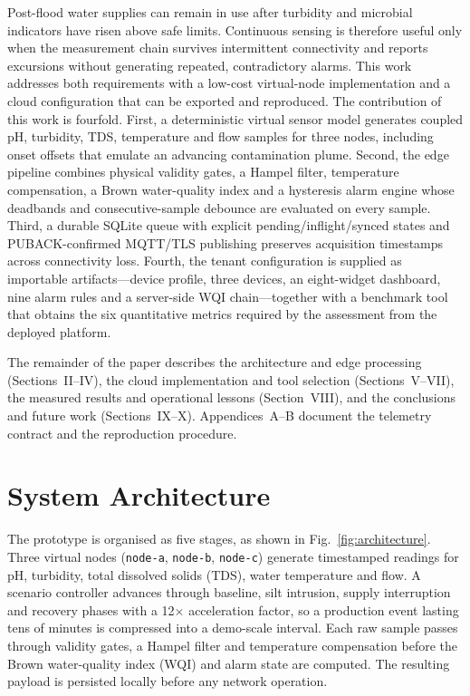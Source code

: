 \documentclass[conference]{IEEEtran}
\begin{document}
Post-flood water supplies can remain in use after turbidity and microbial indicators
have risen above safe limits. Continuous sensing is therefore useful only when the
measurement chain survives intermittent connectivity and reports excursions without
generating repeated, contradictory alarms. This work addresses both requirements with a
low-cost virtual-node implementation and a cloud configuration that can be exported and
reproduced. The contribution of this work is fourfold. First, a deterministic virtual
sensor model generates coupled pH, turbidity, TDS, temperature and flow samples for
three nodes, including onset offsets that emulate an advancing contamination plume.
Second, the edge pipeline combines physical validity gates, a Hampel filter,
temperature compensation, a Brown water-quality index and a hysteresis alarm engine
whose deadbands and consecutive-sample debounce are evaluated on every sample. Third,
a durable SQLite queue with explicit pending/inflight/synced states and
PUBACK-confirmed MQTT/TLS publishing preserves acquisition timestamps across
connectivity loss. Fourth, the tenant configuration is supplied as importable
artifacts---device profile, three devices, an eight-widget dashboard, nine alarm
rules and a server-side WQI chain---together with a benchmark tool that obtains the
six quantitative metrics required by the assessment from the deployed platform.

The remainder of the paper describes the architecture and edge processing
(Sections~II--IV), the cloud implementation and tool selection (Sections~V--VII), the
measured results and operational lessons (Section~VIII), and the conclusions and
future work (Sections~IX--X). Appendices~A--B document the telemetry contract and
the reproduction procedure.

\section{System Architecture}
\label{sec:architecture}

The prototype is organised as five stages, as shown in Fig.~\ref{fig:architecture}.
Three virtual nodes (\texttt{node-a}, \texttt{node-b}, \texttt{node-c}) generate
timestamped readings for pH, turbidity, total dissolved solids (TDS), water
temperature and flow. A scenario controller advances through baseline, silt
intrusion, supply interruption and recovery phases with a 12$\times$ acceleration
factor, so a production event lasting tens of minutes is compressed into a
demo-scale interval. Each raw sample passes through validity gates, a Hampel
filter and temperature compensation before the Brown water-quality index (WQI)
and alarm state are computed. The resulting payload is persisted locally before
any network operation.
\end{document}
